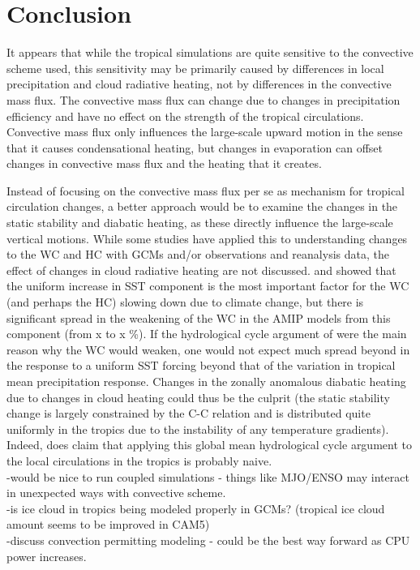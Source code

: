 \documentclass[letterpaper,12pt,titlepage,oneside,final]{book}
\begin{document}
\chapter{Conclusion}
It appears that while the tropical simulations are quite sensitive to the convective scheme used, this sensitivity may be primarily caused by differences in local precipitation and cloud radiative heating, not by differences in the convective mass flux. The convective mass flux can change due to changes in precipitation efficiency and have no effect on the strength of the tropical circulations. Convective mass flux only influences the large-scale upward motion in the sense that it causes condensational heating, but changes in evaporation can offset changes in convective mass flux and the heating that it creates.

Instead of focusing on the convective mass flux per se as mechanism for tropical circulation changes, a better approach would be to examine the changes in the static stability and diabatic heating, as these directly influence the large-scale vertical motions. While some studies have applied this to understanding changes to the WC \citep{sohn_role_2016,ma_mechanisms_2011} and HC \citep{mitas_recent_2006,ma_mechanisms_2011} with GCMs and/or observations and reanalysis data, the effect of changes in cloud radiative heating are not discussed. \citep{he_anthropogenic_2015} and \citep{ma_mechanisms_2011} showed that the uniform increase in SST component is the most important factor for the WC (and perhaps the HC) slowing down due to climate change, but there is significant spread in the weakening of the WC in the AMIP models from this component (from x to x \%). If the hydrological cycle argument of \citep{held_robust_2006} were the main reason why the WC would weaken, one would not expect much spread beyond in the response to a uniform SST forcing beyond that of the variation in tropical mean precipitation response. Changes in the zonally anomalous diabatic heating due to changes in cloud heating could thus be the culprit (the static stability change is largely constrained by the C-C relation and is distributed quite uniformly in the tropics due to the instability of any temperature gradients). Indeed, \citep{schneider_water_2010} does claim that applying this global mean hydrological cycle argument to the local circulations in the tropics is probably naive.
\\
-would be nice to run coupled simulations - things like MJO/ENSO may interact in unexpected ways with convective scheme.
\\
-is ice cloud in tropics being modeled properly in GCMs? (tropical ice cloud amount seems to be improved in CAM5)
\\
-discuss convection permitting modeling - could be the best way forward as CPU power increases.
\\
\end{document}
